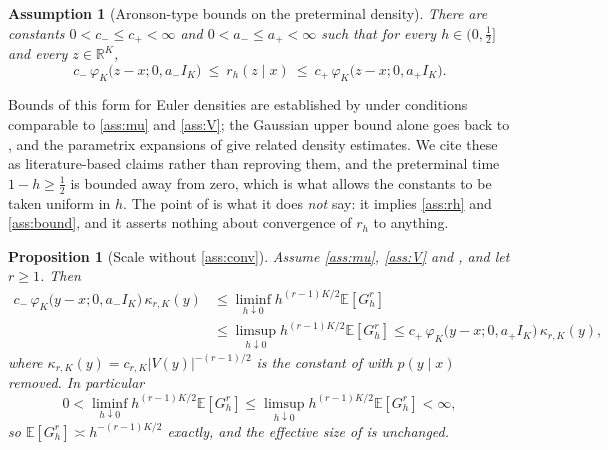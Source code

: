 \documentclass[11pt]{article}
\newtheorem{proposition}[proposition]{Proposition}
\newtheorem{assumption}[assumption]{Assumption}
\theoremstyle{definition}
\newcommand{\R}{\mathbb{R}}
\newcommand{\E}{\mathbb{E}}
\newcommand{\phik}{\varphi_K}
\begin{document}
\begin{assumption}[Aronson-type bounds on the preterminal density]\label{ass:aronson}
There are constants $0<c_-\le c_+<\infty$ and $0<a_-\le a_+<\infty$ such that for every $h\in(0,\tfrac12]$ and every $z\in\R^K$,
\begin{equation}\label{eq:aronson}
c_-\,\phik\bigl(z-x;0,a_-I_K\bigr)
\ \le\ r_h(z\mid x)\ \le\
c_+\,\phik\bigl(z-x;0,a_+I_K\bigr).
\end{equation}
\end{assumption}

Bounds of this form for Euler densities are established by \citet{LemaireMenozzi2010} under conditions comparable to \ref{ass:mu} and \ref{ass:V}; the Gaussian upper bound alone goes back to \citet{BallyTalay1996b}, and the parametrix expansions of \citet{KonakovMammen2002} give related density estimates. We cite these as literature-based claims rather than reproving them, and the preterminal time $1-h\ge\tfrac12$ is bounded away from zero, which is what allows the constants to be taken uniform in $h$. The point of  is what it does \emph{not} say: it implies \ref{ass:rh} and \ref{ass:bound}, and it asserts nothing about convergence of $r_h$ to anything.

\begin{proposition}[Scale without \ref{ass:conv}]\label{prop:aronson_scale}
Assume \ref{ass:mu}, \ref{ass:V} and \Cref{ass:aronson}, and let $r\ge1$. Then
\begin{equation}\label{eq:aronson_bracket}
\begin{aligned}
c_-\,\phik\bigl(y-x;0,a_-I_K\bigr)\,\kappa_{r,K}(y)
&\le\liminf_{h\downarrow0}h^{(r-1)K/2}\E[G_h^r]\\
&\le\limsup_{h\downarrow0}h^{(r-1)K/2}\E[G_h^r]
\le c_+\,\phik\bigl(y-x;0,a_+I_K\bigr)\,\kappa_{r,K}(y),
\end{aligned}
\end{equation}
where $\kappa_{r,K}(y)=c_{r,K}|V(y)|^{-(r-1)/2}$ is the constant of  with $p(y\mid x)$ removed. In particular
\begin{equation}\label{eq:aronson_scale}
0<\liminf_{h\downarrow0}h^{(r-1)K/2}\E[G_h^r]
\le\limsup_{h\downarrow0}h^{(r-1)K/2}\E[G_h^r]<\infty ,
\end{equation}
so $\E[G_h^r]\asymp h^{-(r-1)K/2}$ exactly, and the effective size of  is unchanged.
\end{proposition}
\end{document}
